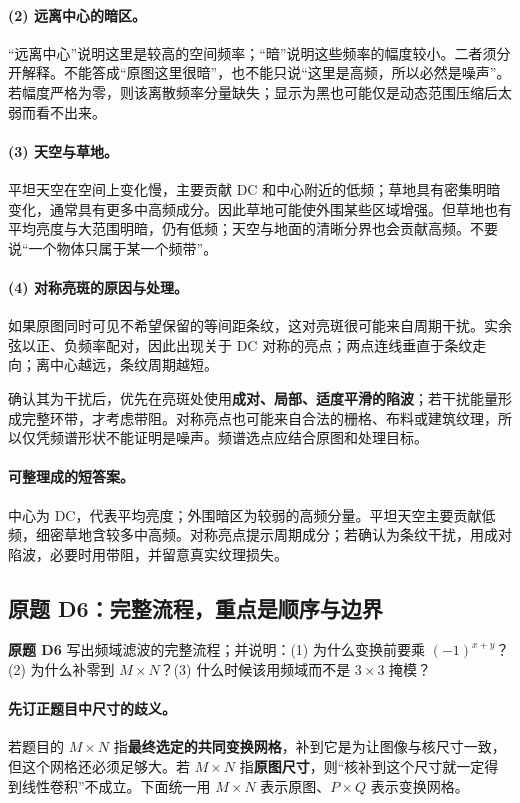 \paragraph{(2) 远离中心的暗区。}
“远离中心”说明这里是较高的空间频率；“暗”说明这些频率的幅度较小。二者须分开解释。不能答成“原图这里很暗”，也不能只说“这里是高频，所以必然是噪声”。若幅度严格为零，则该离散频率分量缺失；显示为黑也可能仅是动态范围压缩后太弱而看不出来。

\paragraph{(3) 天空与草地。}
平坦天空在空间上变化慢，主要贡献 DC 和中心附近的低频；草地具有密集明暗变化，通常具有更多中高频成分。因此草地可能使外围某些区域增强。但草地也有平均亮度与大范围明暗，仍有低频；天空与地面的清晰分界也会贡献高频。不要说“一个物体只属于某一个频带”。

\paragraph{(4) 对称亮斑的原因与处理。}
如果原图同时可见不希望保留的等间距条纹，这对亮斑很可能来自周期干扰。实余弦以正、负频率配对，因此出现关于 DC 对称的亮点；两点连线垂直于条纹走向；离中心越远，条纹周期越短。

确认其为干扰后，优先在亮斑处使用\textbf{成对、局部、适度平滑的陷波}；若干扰能量形成完整环带，才考虑带阻。对称亮点也可能来自合法的栅格、布料或建筑纹理，所以仅凭频谱形状不能证明是噪声。频谱选点应结合原图和处理目标。

\paragraph{可整理成的短答案。}
中心为 DC，代表平均亮度；外围暗区为较弱的高频分量。平坦天空主要贡献低频，细密草地含较多中高频。对称亮点提示周期成分；若确认为条纹干扰，用成对陷波，必要时用带阻，并留意真实纹理损失。

\subsection{原题 D6：完整流程，重点是顺序与边界}
\label{original:D6}

\noindent\textbf{原题 D6}\quad
写出频域滤波的完整流程；并说明：(1) 为什么变换前要乘 $(-1)^{x+y}$？(2) 为什么补零到 $M\times N$？(3) 什么时候该用频域而不是 $3\times3$ 掩模？

\paragraph{先订正题目中尺寸的歧义。}
若题目的 $M\times N$ 指\textbf{最终选定的共同变换网格}，补到它是为让图像与核尺寸一致，但这个网格还必须足够大。若 $M\times N$ 指\textbf{原图尺寸}，则“核补到这个尺寸就一定得到线性卷积”不成立。下面统一用 $M\times N$ 表示原图、$P\times Q$ 表示变换网格。

